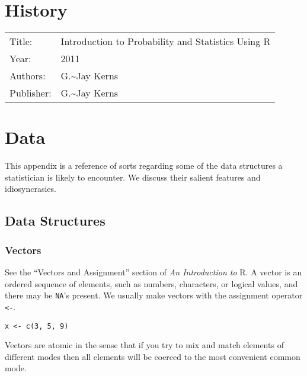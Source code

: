 \documentclass[captions=tableheading]{scrbook}
\begin{document}
\chapter{History}
\label{sec-4}

\label{cha:History}


\begin{center}
\begin{tabular}{ll}
 Title:      &  Introduction to Probability and Statistics Using \textsf{R}  \\
 Year:       &  2011                                                         \\
 Authors:    &  G.\~{}Jay Kerns                                              \\
 Publisher:  &  G.\~{}Jay Kerns                                              \\
\end{tabular}
\end{center}



\vfill{}
\chapter{Data}
\label{sec-5}

\label{cha:data}

This appendix is a reference of sorts regarding some of the data structures a statistician is likely to encounter. We discuss their salient features and idiosyncrasies.
\section{Data Structures \label{sec:Data-Structures}}
\label{sec-5-1}
\subsection{Vectors}
\label{sec-5-1-1}


See the ``Vectors and Assignment'' section of \emph{An Introduction to} \textsf{R}. A vector is an ordered sequence of elements, such as numbers, characters, or logical values, and there may be \texttt{NA}'s present. We usually make vectors with the assignment operator \texttt{<-}.


\begin{verbatim}
x <- c(3, 5, 9)
\end{verbatim}


Vectors are atomic in the sense that if you try to mix and match elements of different modes then all elements will be coerced to the most convenient common mode.
\end{document}
